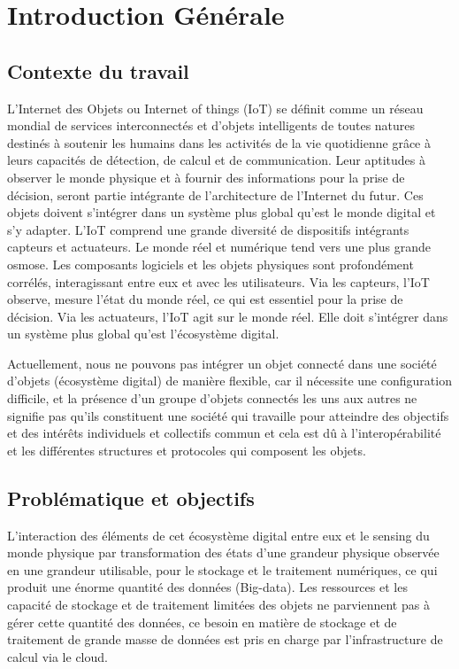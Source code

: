 
 \lhead{}
 \cfoot{ \thepage}
  \pagestyle{fancy}
\renewcommand{\headrulewidth}{0.4pt}


\chapter*{Introduction Générale}
\section*{Contexte du travail}
L’Internet des Objets ou Internet of things (IoT) se définit comme un réseau mondial de services interconnectés et d’objets intelligents de toutes natures destinés à soutenir les humains dans les activités de la vie quotidienne grâce à leurs capacités de détection, de calcul et de communication. Leur aptitudes à observer le monde physique et à fournir des informations pour la prise de décision, seront partie intégrante de l’architecture de l’Internet du futur. Ces objets doivent s’intégrer dans un système plus global qu’est le monde digital et s’y adapter. L’IoT comprend une grande diversité de dispositifs intégrants capteurs et actuateurs. Le monde réel et numérique tend vers une plus grande osmose. Les composants logiciels et les objets physiques sont profondément corrélés, interagissant entre eux et avec les utilisateurs. Via les capteurs, l’IoT observe, mesure l’état du monde réel, ce qui est essentiel pour la prise de décision. Via les actuateurs, l’IoT agit sur le monde réel. Elle doit s’intégrer dans un système plus global qu’est l’écosystème digital. 

Actuellement, nous ne pouvons pas intégrer un objet connecté dans une société d’objets (écosystème digital) de manière flexible, car il nécessite une configuration difficile, et la présence d’un groupe d’objets connectés les uns aux autres ne signifie pas qu’ils constituent une société qui travaille pour atteindre des objectifs et des intérêts individuels et collectifs commun et cela est dû à l’interopérabilité et les différentes structures et protocoles qui composent les objets. 

\section*{Problématique et objectifs}
 L’interaction des éléments de cet écosystème digital entre eux et le sensing du monde physique par transformation des états d’une grandeur physique observée en une grandeur utilisable, pour le stockage et le traitement numériques, ce qui produit une énorme quantité des données (Big-data). Les ressources et les capacité de stockage et de traitement limitées des objets ne parviennent pas à gérer cette quantité des données, ce besoin en matière de stockage et de traitement de grande masse de données est pris en charge par l’infrastructure de calcul via le cloud.
 
